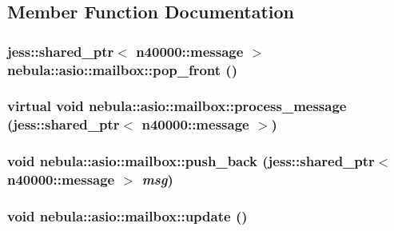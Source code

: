 \subsection{Member Function Documentation}
\hypertarget{classnebula_1_1asio_1_1mailbox_a8e39cb9de42410b472c10ab84ec930b1}{
\subsubsection[{pop\_\-front}]{\setlength{\rightskip}{0pt plus 5cm}jess::shared\_\-ptr$<$ {\bf n40000::message} $>$ nebula::asio::mailbox::pop\_\-front ()}}
\label{classnebula_1_1asio_1_1mailbox_a8e39cb9de42410b472c10ab84ec930b1}
\hypertarget{classnebula_1_1asio_1_1mailbox_a3377065a87912ef3a72108cf88549c11}{
\subsubsection[{process\_\-message}]{\setlength{\rightskip}{0pt plus 5cm}virtual void nebula::asio::mailbox::process\_\-message (jess::shared\_\-ptr$<$ {\bf n40000::message} $>$)}}
\label{classnebula_1_1asio_1_1mailbox_a3377065a87912ef3a72108cf88549c11}
\hypertarget{classnebula_1_1asio_1_1mailbox_a60f52209d59c3ebff7a16b9bd8efe164}{
\subsubsection[{push\_\-back}]{\setlength{\rightskip}{0pt plus 5cm}void nebula::asio::mailbox::push\_\-back (jess::shared\_\-ptr$<$ {\bf n40000::message} $>$ {\em msg})}}
\label{classnebula_1_1asio_1_1mailbox_a60f52209d59c3ebff7a16b9bd8efe164}
\hypertarget{classnebula_1_1asio_1_1mailbox_afee466b6e97ee4116768479dd8337d98}{
\subsubsection[{update}]{\setlength{\rightskip}{0pt plus 5cm}void nebula::asio::mailbox::update ()}}
\label{classnebula_1_1asio_1_1mailbox_afee466b6e97ee4116768479dd8337d98}


